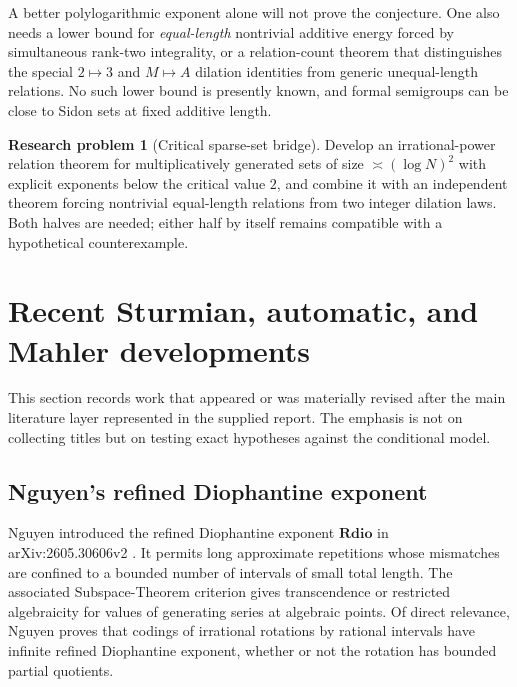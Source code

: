 \documentclass[11pt,oneside]{article}
\theoremstyle{definition}
\newtheorem{problem}[theorem]{Research problem}
\theoremstyle{remark}
\begin{document}
\begin{barrierbox}
A better polylogarithmic exponent alone will not prove the conjecture.  One also needs a lower bound for \emph{equal-length} nontrivial additive energy forced by simultaneous rank-two integrality, or a relation-count theorem that distinguishes the special $2\mapsto3$ and $M\mapsto A$ dilation identities from generic unequal-length relations.  No such lower bound is presently known, and formal semigroups can be close to Sidon sets at fixed additive length.
\end{barrierbox}

\begin{problem}[Critical sparse-set bridge]
Develop an irrational-power relation theorem for multiplicatively generated sets of size $\asymp(\log N)^2$ with explicit exponents below the critical value $2$, and combine it with an independent theorem forcing nontrivial equal-length relations from two integer dilation laws.  Both halves are needed; either half by itself remains compatible with a hypothetical counterexample.
\end{problem}

\section{Recent Sturmian, automatic, and Mahler developments}
\label{sec:recent-literature}

This section records work that appeared or was materially revised after the main literature layer represented in the supplied report.  The emphasis is not on collecting titles but on testing exact hypotheses against the conditional model.

\subsection{Nguyen's refined Diophantine exponent}

Nguyen introduced the refined Diophantine exponent $\mathbf{Rdio}$ in arXiv:2605.30606v2 \cite{NguyenRdio2026}.  It permits long approximate repetitions whose mismatches are confined to a bounded number of intervals of small total length.  The associated Subspace-Theorem criterion gives transcendence or restricted algebraicity for values of generating series at algebraic points.  Of direct relevance, Nguyen proves that codings of irrational rotations by rational intervals have infinite refined Diophantine exponent, whether or not the rotation has bounded partial quotients.
\end{document}
